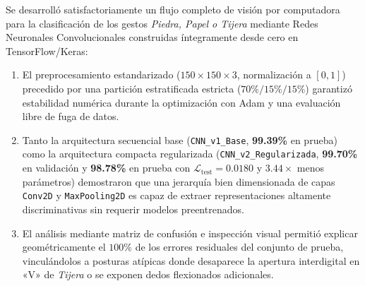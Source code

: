 Se desarrolló satisfactoriamente un flujo completo de visión por computadora para la clasificación de los gestos \textit{Piedra, Papel o Tijera} mediante Redes Neuronales Convolucionales construidas íntegramente desde cero en TensorFlow/Keras:
\begin{enumerate}
    \item El preprocesamiento estandarizado ($150 \times 150 \times 3$, normalización a $[0, 1]$) precedido por una partición estratificada estricta ($70\% / 15\% / 15\%$) garantizó estabilidad numérica durante la optimización con Adam y una evaluación libre de fuga de datos.
    \item Tanto la arquitectura secuencial base (\texttt{CNN\_v1\_Base}, \textbf{99.39\%} en prueba) como la arquitectura compacta regularizada (\texttt{CNN\_v2\_Regularizada}, \textbf{99.70\%} en validación y \textbf{98.78\%} en prueba con $\mathcal{L}_{\text{test}} = 0.0180$ y $3.44\times$ menos parámetros) demostraron que una jerarquía bien dimensionada de capas \texttt{Conv2D} y \texttt{MaxPooling2D} es capaz de extraer representaciones altamente discriminativas sin requerir modelos preentrenados.
    \item El análisis mediante matriz de confusión e inspección visual permitió explicar geométricamente el $100\%$ de los errores residuales del conjunto de prueba, vinculándolos a posturas atípicas donde desaparece la apertura interdigital en «V» de \textit{Tijera} o se exponen dedos flexionados adicionales.
\end{enumerate}
